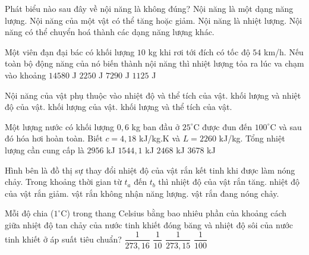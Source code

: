 \begin{ex}
Phát biểu nào sau đây về nội năng là không đúng?
\choice
{Nội năng là một dạng năng lượng.}
{Nội năng của một vật có thể tăng hoặc giảm.}
{\True Nội năng là nhiệt lượng.}
{Nội năng có thể chuyển hoá thành các dạng năng lượng khác.}
\end{ex}

\begin{ex}
Một viên đạn đại bác có khối lượng $10$ kg khi rơi tới đích có tốc độ $54$ km/h. Nếu toàn bộ động năng của nó biến thành nội năng thì nhiệt lượng tỏa ra lúc va chạm vào khoảng
\choice
{$14580$ J}
{$2250$ J}
{$7290$ J}
{\True $1125$ J}
\loigiai{\[v=54\ \mathrm{km/h}=15\ \mathrm{m/s},\qquad W_đ=\frac12mv^2=1125\ \mathrm{J}.\]}
\end{ex}

\begin{ex}
Nội năng của vật phụ thuộc vào
\choice
{\True nhiệt độ và thể tích của vật.}
{khối lượng và nhiệt độ của vật.}
{khối lượng của vật.}
{khối lượng và thể tích của vật.}
\end{ex}

\begin{ex}
Một lượng nước có khối lượng $0,6$ kg ban đầu ở $25^\circ\mathrm{C}$ được đun đến $100^\circ\mathrm{C}$ và sau đó hóa hơi hoàn toàn. Biết $c=4,18$ kJ/kg.K và $L=2260$ kJ/kg. Tổng nhiệt lượng cần cung cấp là
\choice
{$2956$ kJ}
{\True $1544,1$ kJ}
{$2468$ kJ}
{$3678$ kJ}
\loigiai{\[Q_1=0,6\cdot4,18\cdot75=188,1\ \mathrm{kJ},\quad Q_2=0,6\cdot2260=1356\ \mathrm{kJ}.\]
\[Q=1544,1\ \mathrm{kJ}.\]}
\end{ex}

\begin{ex}
Hình bên là đồ thị sự thay đổi nhiệt độ của vật rắn kết tinh khi được làm nóng chảy. Trong khoảng thời gian từ $t_a$ đến $t_b$ thì
\choice
{nhiệt độ của vật rắn tăng.}
{nhiệt độ của vật rắn giảm.}
{vật rắn không nhận năng lượng.}
{\True vật rắn đang nóng chảy.}
\end{ex}

\begin{ex}
Mỗi độ chia ($1^\circ\mathrm{C}$) trong thang Celsius bằng bao nhiêu phần của khoảng cách giữa nhiệt độ tan chảy của nước tinh khiết đóng băng và nhiệt độ sôi của nước tinh khiết ở áp suất tiêu chuẩn?
\choice
{$\dfrac{1}{273,16}$}
{$\dfrac{1}{10}$}
{$\dfrac{1}{273,15}$}
{\True $\dfrac{1}{100}$}
\end{ex}

